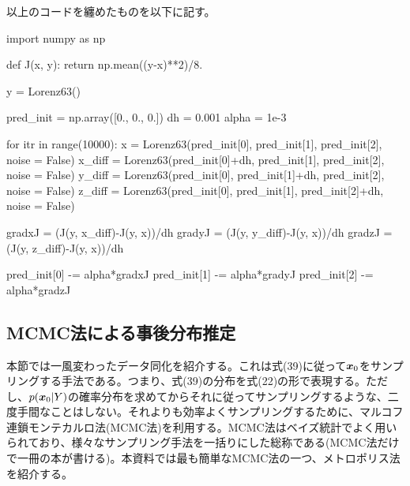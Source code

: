\documentclass[dvipdfmx, 9pt, a4paper]{jsarticle}
\newcommand{\bm}[1]{{\mbox{\boldmath $#1$}}}
\begin{document}
以上のコードを纏めたものを以下に記す。\bigskip
\begin{python}
import numpy as np

def J(x, y):
	return np.mean((y-x)**2)/8.

y = Lorenz63()

pred_init = np.array([0., 0., 0.])
dh = 0.001
alpha = 1e-3

for itr in range(10000):
	x = Lorenz63(pred_init[0], pred_init[1], pred_init[2], noise = False)
	x_diff = Lorenz63(pred_init[0]+dh, pred_init[1], pred_init[2], noise = False)
	y_diff = Lorenz63(pred_init[0], pred_init[1]+dh, pred_init[2], noise = False)
	z_diff = Lorenz63(pred_init[0], pred_init[1], pred_init[2]+dh, noise = False)

	gradxJ = (J(y, x_diff)-J(y, x))/dh
	gradyJ = (J(y, y_diff)-J(y, x))/dh
	gradzJ = (J(y, z_diff)-J(y, x))/dh

	pred_init[0] -= alpha*gradxJ
	pred_init[1] -= alpha*gradyJ
	pred_init[2] -= alpha*gradzJ
\end{python}

\subsection{MCMC法による事後分布推定}
本節では一風変わったデータ同化を紹介する。これは式(39)に従って$\bm x_0$をサンプリングする手法である。つまり、式(39)の分布を式(22)の形で表現する。ただし、$p(\bm x_0|Y)$の確率分布を求めてからそれに従ってサンプリングするような、二度手間なことはしない。それよりも効率よくサンプリングするために、マルコフ連鎖モンテカルロ法(MCMC法)を利用する。MCMC法はベイズ統計でよく用いられており、様々なサンプリング手法を一括りにした総称である(MCMC法だけで一冊の本が書ける)。本資料では最も簡単なMCMC法の一つ、メトロポリス法を紹介する。
\end{document}
